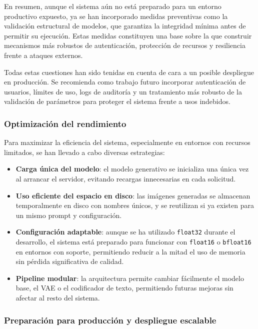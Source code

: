 En resumen, aunque el sistema aún no está preparado para un entorno productivo expuesto, ya se han incorporado medidas preventivas como la validación estructural de modelos, que garantiza la integridad mínima antes de permitir su ejecución. Estas medidas constituyen una base sobre la que construir mecanismos más robustos de autenticación, protección de recursos y resiliencia frente a ataques externos.

Todas estas cuestiones han sido tenidas en cuenta de cara a un posible despliegue en producción. Se recomienda como trabajo futuro incorporar autenticación de usuarios, límites de uso, logs de auditoría y un tratamiento más robusto de la validación de parámetros para proteger el sistema frente a usos indebidos.


\subsubsection{Optimización del rendimiento}

Para maximizar la eficiencia del sistema, especialmente en entornos con recursos limitados, se han llevado a cabo diversas estrategias:

\begin{itemize}
    \item \textbf{Carga única del modelo}: el modelo generativo se inicializa una única vez al arrancar el servidor, evitando recargas innecesarias en cada solicitud.
    \item \textbf{Uso eficiente del espacio en disco}: las imágenes generadas se almacenan temporalmente en disco con nombres únicos, y se reutilizan si ya existen para un mismo prompt y configuración.
    \item \textbf{Configuración adaptable}: aunque se ha utilizado \texttt{float32} durante el desarrollo, el sistema está preparado para funcionar con \texttt{float16} o \texttt{bfloat16} en entornos con soporte, permitiendo reducir a la mitad el uso de memoria sin pérdida significativa de calidad.
    \item \textbf{Pipeline modular}: la arquitectura permite cambiar fácilmente el modelo base, el VAE o el codificador de texto, permitiendo futuras mejoras sin afectar al resto del sistema.
\end{itemize}

\subsubsection{Preparación para producción y despliegue escalable}

